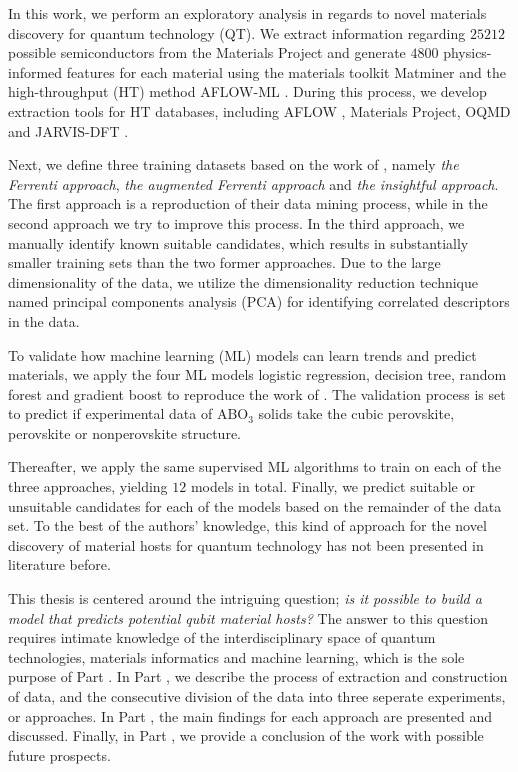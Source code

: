 In this work, we perform an exploratory analysis in regards to novel materials discovery for quantum technology (QT). We extract information regarding $25212$ possible semiconductors from the Materials Project \cite{Jain2013, Jain2016, Jain2018} and generate $4800$ physics-informed features for each material using the materials toolkit Matminer \cite{Ward2018} and the high-throughput (HT) method AFLOW-ML \cite{Isayev2017}.
During this process, we develop extraction tools for HT databases, including AFLOW \cite{Curtarolo2012, Curtarolo2012a, Calderon2015}, Materials Project, OQMD \cite{Saal2013, Kirklin2015} and JARVIS-DFT \cite{Choudhary2020}.

Next, we define three training datasets based on the work of \citeauthor{Ferrenti2020} \cite{Ferrenti2020}, namely \textit{the Ferrenti approach}, \textit{the augmented Ferrenti approach} and \textit{the insightful approach}. The first approach is a reproduction of their data mining process, while in the second approach we try to improve this process. In the third approach, we manually identify known suitable candidates, which results in substantially smaller training sets than the two former approaches. Due to the large dimensionality of the data, we utilize the dimensionality reduction technique named principal components analysis (PCA) for identifying correlated descriptors in the data.

To validate how machine learning (ML) models can learn trends and predict materials, we apply the four ML models logistic regression, decision tree, random forest and gradient boost to reproduce the work of \citeauthor{Balachandran2018} \cite{Balachandran2018}. The validation process is set to predict if experimental data of ABO$_3$ solids take the cubic perovskite, perovskite or nonperovskite structure.

Thereafter, we apply the same supervised ML algorithms to train on each of the three approaches, yielding $12$ models in total. Finally, we predict suitable or unsuitable candidates for each of the models based on the remainder of the data set. To the best of the authors' knowledge, this kind of approach for the novel discovery of material hosts for quantum technology has not been presented in literature before. %

This thesis is centered around the intriguing question; \textit{is it possible to build a model that predicts potential qubit material hosts?} The answer to this question requires intimate knowledge of the interdisciplinary space of quantum technologies, materials informatics and machine learning, which is the sole purpose of Part .
In Part , we describe the process of extraction and construction of data, and the consecutive division of the data into three seperate experiments, or approaches. In Part , the main findings for each approach are presented and discussed. Finally, in Part , we provide a conclusion of the work with possible future prospects.



